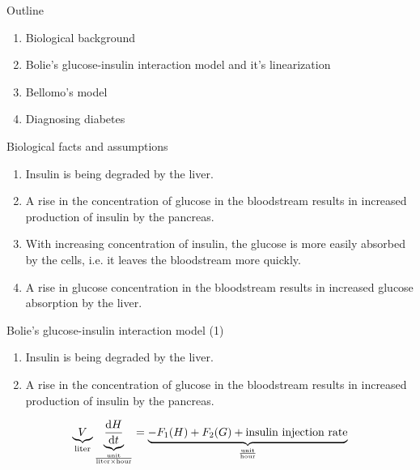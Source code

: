 \documentclass{beamer}
\providecommand{\m}[1]{\ensuremath{\mathrm{#1}}}
\begin{document}
\begin{frame}{Outline}
\begin{enumerate}
 \item Biological background
 \item Bolie's glucose-insulin interaction model and it's linearization
 \item Bellomo's model
 \item Diagnosing diabetes
\end{enumerate}


\end{frame}

\begin{frame}{Biological facts and assumptions}
\begin{enumerate}
	\item
	Insulin is being degraded by the liver.	
	\item
	A rise in the concentration of glucose in the bloodstream results in increased production of insulin by the pancreas.
	\item
	With increasing concentration of insulin, the glucose is more easily absorbed by the cells, i.e. it leaves the bloodstream more quickly.
	\item
	A rise in glucose concentration in the bloodstream results in increased glucose absorption by the liver.

\end{enumerate}
\end{frame}

\begin{frame}{Bolie's glucose-insulin interaction model (1)}

\begin{enumerate}
	\item
	Insulin is being degraded by the liver.	
	\item
	A rise in the concentration of glucose in the 			bloodstream results in increased production of 			insulin by the pancreas.
\end{enumerate}

\begin{align*}
\underbrace{V}_%
{\text{liter}}%
%
\underbrace{\frac{\m{d} H}{\m{d} t}}_%
{\frac{\text{unit}}{\text{liter} \times\text{hour}}}
=%
\underbrace{-F_1(H)+F_2(G)+\text{insulin injection rate}}%
_{\frac{\text{unit}}{\text{hour}}}
\end{align*}

\end{frame}
\end{document}
